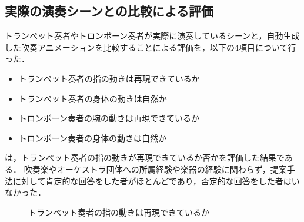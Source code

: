 \subsection{実際の演奏シーンとの比較による評価}
トランペット奏者やトロンボーン奏者が実際に演奏しているシーンと，自動生成した吹奏アニメーションを比較することによる評価を，以下の4項目について行った．
\begin{itemize}
	\item トランペット奏者の指の動きは再現できているか
	\item トランペット奏者の身体の動きは自然か
	\item トロンボーン奏者の腕の動きは再現できているか
	\item トロンボーン奏者の身体の動きは自然か
\end{itemize}
\vspace{5mm}
\par
{}は，トランペット奏者の指の動きが再現できているか否かを評価した結果である．
吹奏楽やオーケストラ団体への所属経験や楽器の経験に関わらず，提案手法に対して肯定的な回答をした者がほとんどであり，否定的な回答をした者はいなかった．
\begin{figure}[!h]
	\centering
	\caption{トランペット奏者の指の動きは再現できているか}
	\label{fig:Q1-1}
\end{figure}
